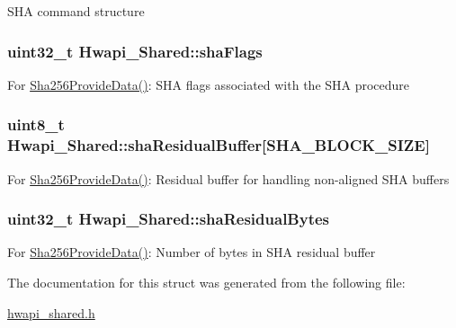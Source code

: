 S\-H\-A command structure \hypertarget{structHwapi__Shared_a4daa23a0ce088b8e163bcb52f4938643}{
\subsubsection[{sha\-Flags}]{\setlength{\rightskip}{0pt plus 5cm}uint32\-\_\-t Hwapi\-\_\-\-Shared\-::sha\-Flags}}\label{structHwapi__Shared_a4daa23a0ce088b8e163bcb52f4938643}
For \hyperlink{sha_8h_aaa10e604bde7ad91ac25281af784e1fc}{Sha256\-Provide\-Data()}\-: S\-H\-A flags associated with the S\-H\-A procedure \hypertarget{structHwapi__Shared_a932eec08d4c7d1cac7052e9c68e75b7c}{
\subsubsection[{sha\-Residual\-Buffer}]{\setlength{\rightskip}{0pt plus 5cm}uint8\-\_\-t Hwapi\-\_\-\-Shared\-::sha\-Residual\-Buffer\mbox{[}{\bf S\-H\-A\-\_\-\-B\-L\-O\-C\-K\-\_\-\-S\-I\-Z\-E}\mbox{]}}}\label{structHwapi__Shared_a932eec08d4c7d1cac7052e9c68e75b7c}
For \hyperlink{sha_8h_aaa10e604bde7ad91ac25281af784e1fc}{Sha256\-Provide\-Data()}\-: Residual buffer for handling non-\/aligned S\-H\-A buffers \hypertarget{structHwapi__Shared_a592f7a59a8c6a27526d868bc6a379ee0}{
\subsubsection[{sha\-Residual\-Bytes}]{\setlength{\rightskip}{0pt plus 5cm}uint32\-\_\-t Hwapi\-\_\-\-Shared\-::sha\-Residual\-Bytes}}\label{structHwapi__Shared_a592f7a59a8c6a27526d868bc6a379ee0}
For \hyperlink{sha_8h_aaa10e604bde7ad91ac25281af784e1fc}{Sha256\-Provide\-Data()}\-: Number of bytes in S\-H\-A residual buffer 

The documentation for this struct was generated from the following file\-:\begin{DoxyCompactItemize}
\item 
\hyperlink{hwapi__shared_8h}{hwapi\-\_\-shared.\-h}\end{DoxyCompactItemize}
